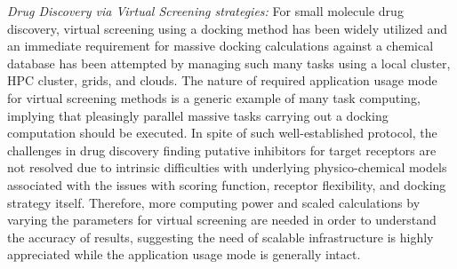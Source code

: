 \documentclass{sig-alternate}
\begin{document}
\textit{Drug Discovery via Virtual Screening strategies:} For small
molecule drug discovery, virtual screening using a docking method has
been widely utilized and an immediate requirement for massive docking
calculations against a chemical database has been attempted by
managing such many tasks using a local cluster, HPC cluster, grids,
and clouds\cite{levesque2009,yim2010}.  The nature of required
application usage mode for virtual screening methods is a generic
example of many task computing, implying that pleasingly parallel
massive tasks carrying out a docking computation should be executed.
In spite of such well-established protocol, the challenges in drug
discovery finding putative inhibitors for target receptors are not
resolved due to intrinsic difficulties with underlying
physico-chemical models associated with the issues with scoring
function, receptor flexibility, and docking strategy itself.
Therefore, more computing power and scaled calculations by varying the
parameters for virtual screening are needed in order to understand the
accuracy of results, suggesting the need of scalable infrastructure is
highly appreciated while the application usage mode is generally
intact.



\end{document}
